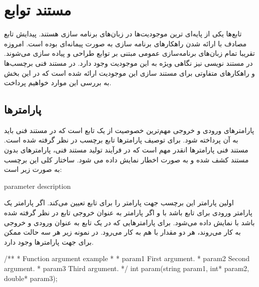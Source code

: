%
% 
% 
% 
%
\section{مستند توابع}

تابع‌ها یکی از پایه‌ای ترین موجودیت‌ها در زبان‌های برنامه سازی هستند.
پیدایش تابع مصادف با ارائه شدن راهکارهای برنامه سازی به صورت پیمانه‌ای بوده است.
امروزه تقریبا تمام زبان‌های برنامه‌سازی عمومی مبتنی بر توابع طراحی و پیاده سازی
می‌شوند.
در مستند نویسی نیز نگاهی ویژه به این موجودیت وجود دارد.
در مستند فنی برچسب‌ها و راهکارهای متفاوتی برای مستند سازی این موجودیت ارائه شده
است که در این بخش به بررسی این موارد خواهیم پرداخت.

\subsection{پارامترها}

پارامترهای ورودی و خروجی مهم‌ترین خصوصیت از یک تابع است که در مستند فنی باید به آن پرداخته شود.
برای توصیف پارامترها تابع برچسب  در نظر گرفته شده است.
مستند فنی پارامترها انقدر مهم است که در فرآیند تولید مستند فنی، پارامترهای بدون مستند کشف شده و 
به صورت اخطار نمایش داده می شود.
ساختار کلی این برچسب به صورت زیر است:
\begin{C++}
 { parameter description }
\end{C++}

اولین پارامتر این برچسب جهت پارامتر را برای تابع تعیین می‌کند.
اگر پارامتر یک پارامتر ورودی برای تابع باشد با  و اگر پارامتر
به عنوان خروجی تابع در نظر گرفته شده باشد با  نمایش داده می‌شود.
برای پارامترهایی که در یک تابع به عنوان ورودی و خروجی به کار می‌روند، هر دو مقدار 
با هم به کار می‌رود.
در نمونه زیر هر سه حالت ممکن برای جهت پارامترها وجود دارد. 
\begin{C++}
/**
 * \brief Function argument example
 *
 * \param[in]      param1 First argument.
 * \param[out]      param2 Second argument.
 * \param[in,out] param3 Third argument.
 */
int param(string param1, int* param2, double* param3);
\end{C++}


